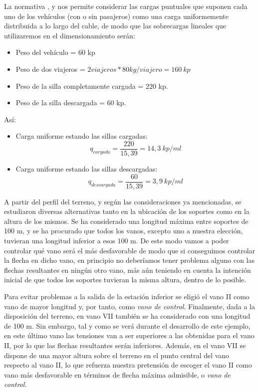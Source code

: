 \documentclass[a4paper,11pt]{article}
\begin{document}
\par La normativa \cite{BOE2002a}, \cite{Europea2016} y \cite{Europea2018} nos permite considerar las cargas puntuales que suponen cada uno de los vehículos (con o sin pasajeros) como una carga uniformemente distribuida a lo largo del cable, de modo que las sobrecargas lineales que utilizaremos en el dimensionamiento serán:\\
\begin{itemize}
\item Peso del vehículo = 60 kp
\item Peso de dos viajeros = $2 viajeros * 80 kg/viajero = 160~kp$
\item Peso de la silla completamente cargada = 220 kp.
\item Peso de la silla descargada = 60 kp.
\end{itemize}
Así:
\begin{itemize}
\item Carga uniforme estando las sillas cargadas:
\begin{displaymath}
q_{cargada} = \frac{220}{15,39} = 14,3~kp/ml 
\end{displaymath}
\item Carga uniforme estando las sillas descargadas:
\begin{displaymath}
q_{descargada} = \frac{60}{15,39} = 3,9~kp/ml 
\end{displaymath}
\end{itemize}
\par A partir del perfil del terreno, y según las consideraciones ya mencionadas, se estudiaron diversas alternativas tanto en la ubicación de los soportes como en la altura de los mismos. Se ha considerado una longitud máxima entre soportes de 100 m, y se ha procurado que todos los vanos, excepto uno a nuestra elección, tuvieran una longitud inferior a esos 100 m. De este modo vamos a poder controlar qué vano será el más desfavorable de modo que si conseguimos controlar la flecha en dicho vano, en principio no deberíamos tener problema alguno con las flechas resultantes en ningún otro vano, más aún teniendo en cuenta la intención inicial de que todos los soportes tuvieran la misma altura, dentro de lo posible.\\
\par Para evitar problemas a la salida de la estación inferior se eligió el vano II como vano de mayor longitud y, por tanto, como {\em vano de control}. Finalmente, dada a la disposición del terreno, en vano VII también se ha considerado con una longitud de 100 m. Sin embargo, tal y como se verá durante el desarrollo de este ejemplo, en este último vano las tensiones van a ser superiores a las obtenidas para el vano II, por lo que las flechas resultantes serán inferiores. Además, en el vano VII se dispone de una mayor altura sobre el terreno en el punto central del vano respecto al vano II, lo que refuerza nuestra pretensión de escoger el vano II como vano más desfavorable en términos de flecha máxima admisible, o {\em vano de control.}\\
\end{document}
